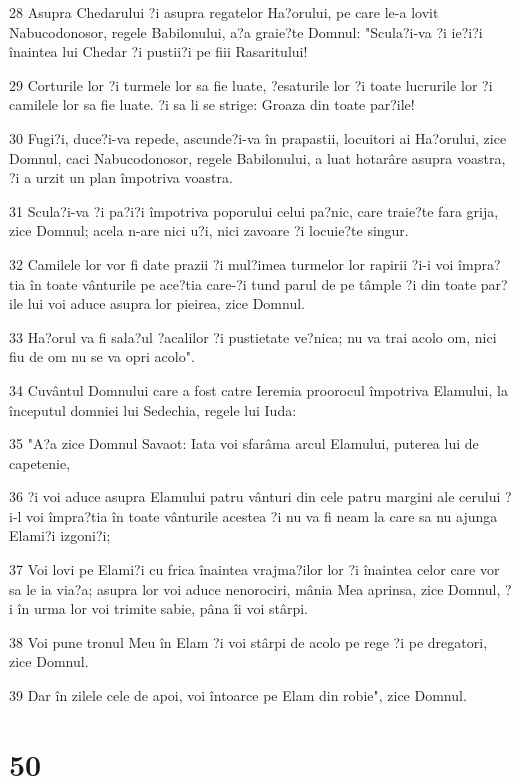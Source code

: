 \par 28 Asupra Chedarului ?i asupra regatelor Ha?orului, pe care le-a lovit Nabucodonosor, regele Babilonului, a?a graie?te Domnul: "Scula?i-va ?i ie?i?i înaintea lui Chedar ?i pustii?i pe fiii Rasaritului!
\par 29 Corturile lor ?i turmele lor sa fie luate, ?esaturile lor ?i toate lucrurile lor ?i camilele lor sa fie luate. ?i sa li se strige: Groaza din toate par?ile!
\par 30 Fugi?i, duce?i-va repede, ascunde?i-va în prapastii, locuitori ai Ha?orului, zice Domnul, caci Nabucodonosor, regele Babilonului, a luat hotarâre asupra voastra, ?i a urzit un plan împotriva voastra.
\par 31 Scula?i-va ?i pa?i?i împotriva poporului celui pa?nic, care traie?te fara grija, zice Domnul; acela n-are nici u?i, nici zavoare ?i locuie?te singur.
\par 32 Camilele lor vor fi date prazii ?i mul?imea turmelor lor rapirii ?i-i voi împra?tia în toate vânturile pe ace?tia care-?i tund parul de pe tâmple ?i din toate par?ile lui voi aduce asupra lor pieirea, zice Domnul.
\par 33 Ha?orul va fi sala?ul ?acalilor ?i pustietate ve?nica; nu va trai acolo om, nici fiu de om nu se va opri acolo".
\par 34 Cuvântul Domnului care a fost catre Ieremia proorocul împotriva Elamului, la începutul domniei lui Sedechia, regele lui Iuda:
\par 35 "A?a zice Domnul Savaot: Iata voi sfarâma arcul Elamului, puterea lui de capetenie,
\par 36 ?i voi aduce asupra Elamului patru vânturi din cele patru margini ale cerului ?i-l voi împra?tia în toate vânturile acestea ?i nu va fi neam la care sa nu ajunga Elami?i izgoni?i;
\par 37 Voi lovi pe Elami?i cu frica înaintea vrajma?ilor lor ?i înaintea celor care vor sa le ia via?a; asupra lor voi aduce nenorociri, mânia Mea aprinsa, zice Domnul, ?i în urma lor voi trimite sabie, pâna îi voi stârpi.
\par 38 Voi pune tronul Meu în Elam ?i voi stârpi de acolo pe rege ?i pe dregatori, zice Domnul.
\par 39 Dar în zilele cele de apoi, voi întoarce pe Elam din robie", zice Domnul.

\chapter{50}

